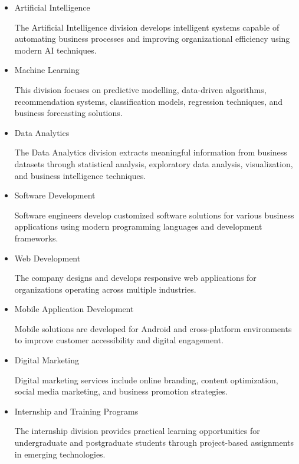 \documentclass[12pt,a4paper]{report}
\begin{document}
\begin{itemize}

\item Artificial Intelligence

The Artificial Intelligence division develops intelligent systems capable of automating business processes and improving organizational efficiency using modern AI techniques.

\item Machine Learning

This division focuses on predictive modelling, data-driven algorithms, recommendation systems, classification models, regression techniques, and business forecasting solutions.

\item Data Analytics

The Data Analytics division extracts meaningful information from business datasets through statistical analysis, exploratory data analysis, visualization, and business intelligence techniques.

\item Software Development

Software engineers develop customized software solutions for various business applications using modern programming languages and development frameworks.

\item Web Development

The company designs and develops responsive web applications for organizations operating across multiple industries.

\item Mobile Application Development

Mobile solutions are developed for Android and cross-platform environments to improve customer accessibility and digital engagement.

\item Digital Marketing

Digital marketing services include online branding, content optimization, social media marketing, and business promotion strategies.

\item Internship and Training Programs

The internship division provides practical learning opportunities for undergraduate and postgraduate students through project-based assignments in emerging technologies.

\end{itemize}
\end{document}

